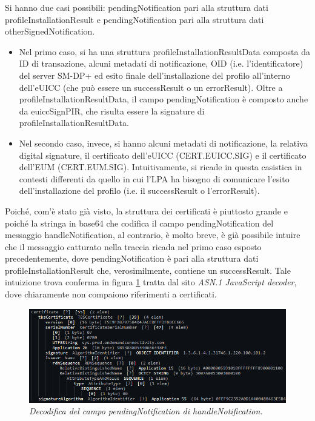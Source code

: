 \documentclass[10pt, oneside]{book}
\begin{document}
Si hanno due casi possibili: pendingNotification pari alla struttura dati profileInstallationResult e pendingNotification pari alla struttura dati otherSignedNotification.
\begin{itemize}
\item Nel primo caso, si ha una struttura profileInstallationResultData composta da ID di transazione, alcuni metadati di notificazione, OID (i.e. l'identificatore) del server SM-DP+ ed esito finale dell'installazione del profilo all'interno dell'eUICC (che può essere un successResult o un errorResult). Oltre a profileInstallationResultData, il campo pendingNotification è composto anche da euiccSignPIR, che risulta essere la signature di profileInstallationResultData.
\item Nel secondo caso, invece, si hanno alcuni metadati di notificazione, la relativa digital signature, il certificato dell'eUICC (CERT.EUICC.SIG) e il certificato dell'EUM (CERT.EUM.SIG). Intuitivamente, si ricade in questa casistica in contesti differenti da quello in cui l'LPA ha bisogno di comunicare l'esito dell'installazione del profilo (i.e. il successResult o l'errorResult).
\end{itemize}
Poiché, com'è stato già visto, la struttura dei certificati è piuttosto grande e poiché la stringa in base64 che codifica il campo pendingNotification del messaggio handleNotification, al contrario, è molto breve, è già possibile intuire che il messaggio catturato nella traccia ricada nel primo caso esposto precedentemente, dove pendingNotification è pari alla struttura dati profileInstallationResult che, verosimilmente, contiene un successResult. Tale intuizione trova conferma in figura \ref{fig:decode-pendingNotification} tratta dal sito \textit{ASN.1 JavaScript decoder}, dove chiaramente non compaiono riferimenti a certificati.
\begin{figure}
\includegraphics[width=\linewidth]{decode-pendingNotification.png}
\caption{\textit{Decodifica del campo pendingNotification di handleNotification.}}
\label{fig:decode-pendingNotification}
\end{figure}
\end{document}
